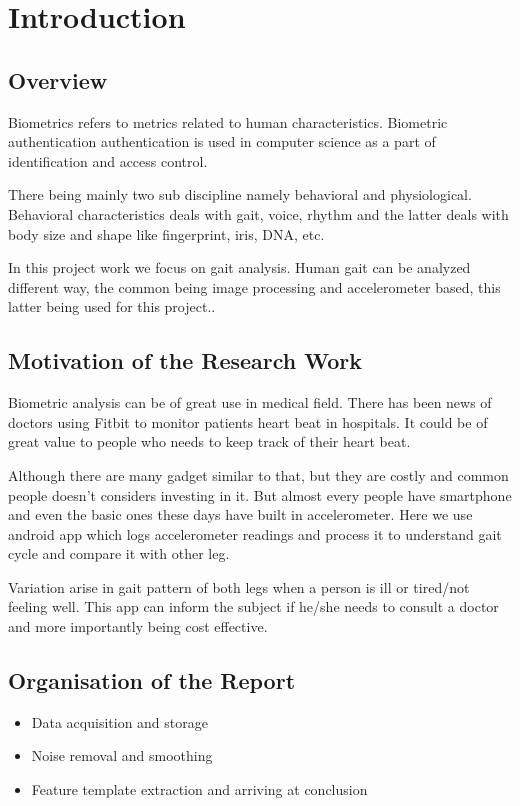 \chapter{Introduction}\label{chap1}

\section{Overview}


Biometrics refers to metrics related to human characteristics. Biometric authentication authentication is used in computer science as a part of identification and access control\cite{biometrics}. \newline


There being mainly two sub discipline namely behavioral and physiological. Behavioral characteristics deals with gait, voice, rhythm and the latter deals with body size and shape like fingerprint, iris, DNA, etc\cite{biometrics}.\newline

In this project work we focus on gait analysis. Human gait can be analyzed different way, the common being image processing and accelerometer based, this latter being used for this project..\\



\section{Motivation of the Research Work}\label{sec1.1}



Biometric analysis can be of great use in medical field. There has been news of doctors using Fitbit to monitor patients heart beat in hospitals. It could be of great value to people who needs to keep track of their heart beat. \newline

Although there are many gadget similar to that, but they are costly and common people doesn’t considers investing in it. But almost every people have smartphone and even the basic ones these days have built in accelerometer. Here we use android app which logs accelerometer readings and process it to understand gait cycle and compare it with other leg.\newline

Variation arise in gait pattern of both legs when a person is ill or tired/not feeling well. This app can inform the subject if he/she needs to consult a doctor and more importantly being cost effective.
\newpage
\section{Organisation of the Report}\label{sec1.3}
\begin{itemize}
\item Data acquisition and storage
\item Noise removal and smoothing 
\item Feature template extraction and arriving at conclusion
\end{itemize}




